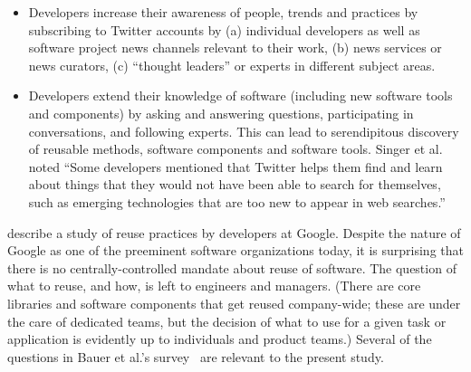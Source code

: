 \documentclass{casicswhitepaper}
\begin{document}
\begin{itemize}

\item Developers increase their awareness of people, trends and practices by subscribing to Twitter accounts by (a) individual developers as well as software project news channels relevant to their work, (b) news services or news curators, (c) ``thought leaders'' or experts in different subject areas.  

\item Developers extend their knowledge of software (including new software tools and components) by asking and answering questions, participating in conversations, and following experts.  This can lead to serendipitous discovery of reusable methods, software components and software tools.  Singer et al. noted ``Some developers mentioned that Twitter helps them find and learn about things that they would not have been able to search for themselves, such as emerging technologies that are too new to appear in web searches.''

\end{itemize}

\citet{bauer2014exploratory} describe a study of reuse practices by developers at Google.  Despite the nature of Google as one of the preeminent software organizations today, it is surprising that there is no centrally-controlled mandate about reuse of software.  The question of what to reuse, and how, is left to engineers and managers.  (There are core libraries and software components that get reused company-wide; these are under the care of dedicated teams, but the decision of what to use for a given task or application is evidently up to individuals and product teams.)  Several of the questions in Bauer et al.'s survey~\cite{bauer2014exploratory} are relevant to the present study.
\end{document}

